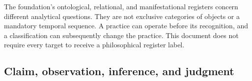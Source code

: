 \documentclass[11pt,a4paper]{article}
\begin{document}
The foundation's ontological, relational, and manifestational registers concern different analytical questions. They are not exclusive categories of objects or a mandatory temporal sequence. A practice can operate before its recognition, and a classification can subsequently change the practice. This document does not require every target to receive a philosophical register label.


\subsection{Claim, observation, inference, and judgment}
\end{document}
